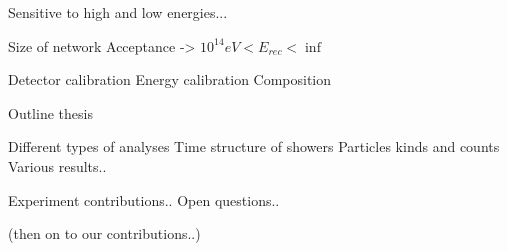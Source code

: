 Sensitive to high and low energies...



Size of network
Acceptance -> $10^{14} eV < E_{rec} < \inf$

Detector calibration
Energy calibration
Composition

Outline thesis

    Different types of analyses
    Time structure of showers
    Particles kinds and counts
    Various results..

Experiment contributions..
Open questions..

(then on to our contributions..)
